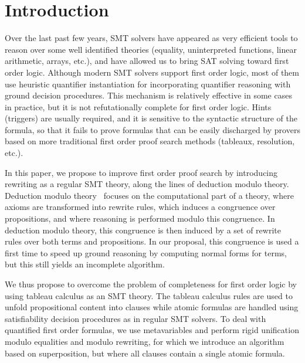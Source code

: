 
\section{Introduction}

Over the last past few
years, SMT solvers have appeared as very efficient tools to reason over some
well identified theories (equality, uninterpreted functions, linear arithmetic,
arrays, etc.), and have allowed us to bring SAT solving toward first order logic.
Although modern SMT solvers support first order logic, most of them use
heuristic quantifier instantiation for incorporating quantifier reasoning with
ground decision procedures. This mechanism is relatively effective in some cases
in practice, but it is not refutationally complete for first order logic. Hints
(triggers) are usually required, and it is sensitive to the syntactic structure
of the formula, so that it fails to prove formulas that can be easily discharged
by provers based on more traditional first order proof search methods (tableaux,
resolution, etc.).

In this paper, we propose to improve first order proof search by introducing
rewriting as a regular SMT theory, along the lines of
deduction modulo theory. Deduction modulo theory~\cite{DA03} focuses on the
computational part of a theory, where axioms are transformed into rewrite rules,
which induces a congruence over propositions, and where reasoning is performed
modulo this congruence. In deduction modulo theory, this congruence is then
induced by a set of rewrite rules over both terms and propositions. In our
proposal, this congruence is used a first time to speed up ground reasoning
by computing normal forms for terms, but this still yields an incomplete
algorithm.

We thus propose to overcome the problem of completeness for first
order logic by using tableau calculus as an SMT theory. The tableau calculus
rules are used to unfold propositional content into clauses while atomic
formulas are handled using satisfiability decision procedures as in
regular SMT solvers. To deal with quantified first order formulas, we use
metavariables and perform rigid unification modulo equalities and modulo rewriting,
for which we introduce an algorithm based on superposition, but where all clauses
contain a single atomic formula.

